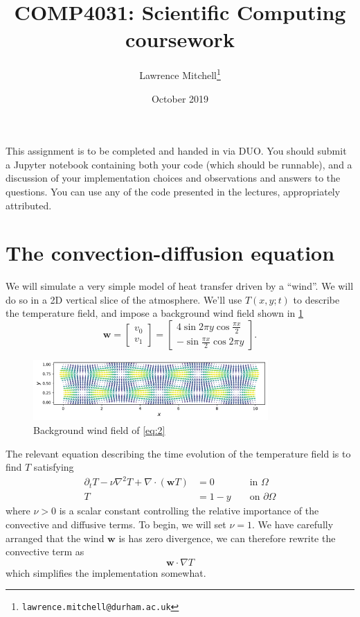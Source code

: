 \documentclass[11pt,a4paper]{article}
\title{COMP4031: Scientific Computing coursework}
\author{Lawrence Mitchell\thanks{\texttt{lawrence.mitchell@durham.ac.uk}}}
\date{October 2019}
\renewcommand{\vec}[1]{\ensuremath{\mathbf{#1}}}
\begin{document}
\maketitle{}

\noindent
This assignment is to be completed and handed in via DUO. You should
submit a Jupyter notebook containing both your code (which should be
runnable), and a discussion of your implementation choices and
observations and answers to the questions. You can use any of the code
presented in the lectures, appropriately attributed.

\section{The convection-diffusion equation}
\label{sec:part1}

We will simulate a very simple model of heat transfer driven by a
``wind''. We will do so in a 2D vertical slice of the atmosphere.
We'll use $T(x, y; t)$ to describe the temperature field, and impose a
background wind field shown in \cref{fig:wind}
\begin{equation}
  \label{eq:2}
  \vec{w} = \begin{bmatrix}v_0\\v_1\end{bmatrix} = \begin{bmatrix}
    4 \sin 2\pi y \cos \frac{\pi x}{2}\\
    -\sin \frac{\pi x}{2} \cos 2\pi y\end{bmatrix}.
\end{equation}
\begin{figure}[htbp]
  \centering
  \includegraphics[width=0.8\textwidth]{wind-field}
  \caption{Background wind field of \cref{eq:2}}
  \label{fig:wind}
\end{figure}

The relevant equation describing the time evolution of the temperature
field is to find $T$ satisfying
\begin{equation}
  \label{eq:1}
  \begin{aligned}
  \partial_t T - \nu \nabla^2 T + \nabla \cdot (\vec{w} T) &= 0 &&\text{ in } \Omega\\
  T &= 1 - y &&\text{ on } \partial\Omega
  \end{aligned}
\end{equation}
where $\nu > 0$ is a scalar constant controlling the relative
importance of the convective and diffusive terms. To begin, we will
set $\nu = 1$. We have carefully arranged that the wind $\vec{w}$ is
has zero divergence, we can therefore rewrite the convective term as
\begin{equation}
  \label{eq:3}
  \vec{w} \cdot \nabla T
\end{equation}
which simplifies the implementation somewhat.
\end{document}
